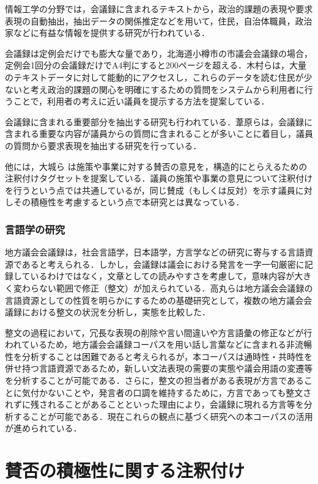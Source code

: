 \documentclass[japanese]{jnlp_1.4}
\begin{document}
情報工学の分野では，会議録に含まれるテキストから，政治的課題の表現や要求表現の自動抽出，抽出データの関係推定などを用いて，住民，自治体職員，政治家などに有益な情報を提供する研究が行われている．

会議録は定例会だけでも膨大な量であり，北海道小樽市の市議会会議録の場合，定例会1回分の会議録だけでA4判にすると200ページを超える．木村ら\cite{kim3}は，大量のテキストデータに対して能動的にアクセスし，これらのデータを読む住民が少ないと考え政治的課題の関心を明確にするための質問をシステムから利用者に行うことで，利用者の考えに近い議員を提示する方法を提案している．

会議録に含まれる重要部分を抽出する研究も行われている．葦原ら\cite{ashr}は，会議録に含まれる重要な内容が議員からの質問に含まれることが多いことに着目し，議員の質問から要求表現を抽出する研究を行っている．

他には，大城ら\cite{osr} は施策や事業に対する賛否の意見を，構造的にとらえるための注釈付けタグセットを提案している．議員の施策や事業の意見について注釈付けを行うという点では共通しているが，同じ賛成（もしくは反対）を示す議員に対しその積極性を考慮するという点で本研究とは異なっている．


\subsubsection{言語学の研究}

地方議会会議録は，社会言語学，日本語学，方言学などの研究に寄与する言語資源であると考えられる．しかし，会議録は議会における発言を一字一句厳密に記録しているわけではなく，文章としての読みやすさを考慮して，意味内容が大きく変わらない範囲で修正（整文）が加えられている．高丸ら\cite{tkmr,tkmr1,tkmr2}は地方議会会議録の言語資源としての性質を明らかにするための基礎研究として，複数の地方議会会議録における整文の状況を分析し，実態を比較した．

整文の過程において，冗長な表現の削除や言い間違いや方言語彙の修正などが行われているため，地方議会会議録コーパスを用い話し言葉などに含まれる非流暢性を分析することは困難であると考えられるが，本コーパスは通時性・共時性を併せ持つ言語資源であるため，新しい文法表現の需要の実態や議会用語の変遷等を分析することが可能である．さらに，整文の担当者がある表現が方言であることに気付かないことや，発言者の口調を維持するために，方言であっても整文されずに残されることがあることといった理由により，会議録に現れる方言等を分析することが可能である．現在これらの観点に基づく研究への本コーパスの活用が進められている．


\section{賛否の積極性に関する注釈付け}
\end{document}
